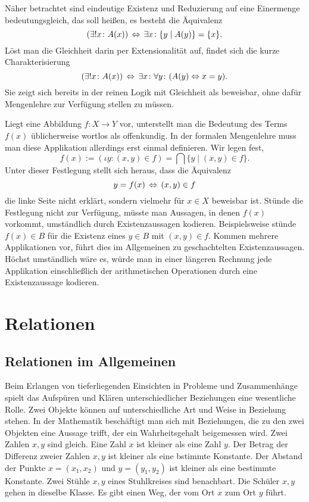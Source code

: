Näher betrachtet sind eindeutige Existenz und Reduzierung auf eine
Einermenge bedeutungsgleich, das soll heißen, es besteht die Äquivalenz
\[(\exists! x\colon A(x))\,\Leftrightarrow\, \exists x\colon \{y\mid A(y)\} = \{x\}.\]
Löst man die Gleichheit darin per Extensionalität auf, findet sich die
kurze Charakterisierung
\[(\exists! x\colon A(x))\,\Leftrightarrow\, \exists x\colon\forall y\colon (A(y)\Leftrightarrow x=y).\]
Sie zeigt sich bereits in der reinen Logik mit Gleichheit als beweisbar,
ohne dafür Mengenlehre zur Verfügung stellen zu müssen.

Liegt eine Abbildung $f\colon X\to Y$ vor, unterstellt man die
Bedeutung des Terms $f(x)$ üblicherweise wortlos als offenkundig.
In der formalen Mengenlehre muss man diese Applikation allerdings erst
einmal definieren. Wir legen fest,
\[f(x) := (\iota y\colon (x,y)\in f)
= \textstyle{\bigcap}\{y\mid (x, y)\in f\}.\]
Unter dieser Festlegung stellt sich heraus, dass die Äquivalenz
\[y = f(x)\,\Leftrightarrow\, (x,y)\in f\]
die linke Seite nicht erklärt, sondern vielmehr für
$x\in X$ beweisbar ist. Stünde die Festlegung nicht zur Verfügung,
müsste man Aussagen, in denen $f(x)$ vorkommt, umständlich durch
Existenzaussagen kodieren. Beispielsweise stünde $f(x)\in B$ für die
Existenz eines $y\in B$ mit $(x,y)\in f$. Kommen mehrere Applikationen
vor, führt dies im Allgemeinen zu geschachtelten Existenzaussagen.
Höchst umständlich wäre es, würde man in einer längeren Rechnung jede
Applikation einschließlich der arithmetischen Operationen durch eine
Existenzaussage kodieren.

\section{Relationen}

\subsection{Relationen im Allgemeinen}

Beim Erlangen von tieferliegenden Einsichten in Probleme und
Zusammenhänge spielt das Aufspüren und Klären unterschiedlicher
Beziehungen eine wesentliche Rolle. Zwei Objekte können auf
unterschiedliche Art und Weise in Beziehung stehen. In der Mathematik
beschäftigt man sich mit Beziehungen, die zu den zwei Objekten eine
Aussage trifft, der ein Wahrheitsgehalt beigemessen wird. Zwei Zahlen
$x,y$ sind gleich. Eine Zahl $x$ ist kleiner als eine Zahl $y$. Der
Betrag der Differenz zweier Zahlen $x,y$ ist kleiner als eine bstimmte
Konstante. Der Abstand der Punkte $x=(x_1,x_2)$ und $y=(y_1,y_2)$ ist
kleiner als eine bestimmte Konstante. Zwei Stühle $x,y$ eines
Stuhlkreises sind benachbart. Die Schüler $x,y$ gehen in dieselbe
Klasse. Es gibt einen Weg, der vom Ort $x$ zum Ort $y$ führt.

